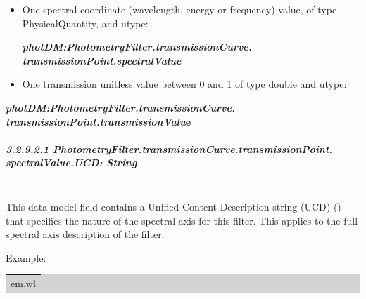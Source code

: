 \documentclass[11pt,a4paper]{ivoa}
\begin{document}
\begin{itemize}
	\item One spectral coordinate (wavelength, energy or frequency) value, of type PhysicalQuantity, and utype:\par

\begin{center}
{\fontsize{10pt}{12.0pt}\selectfont \textbf{\textit{photDM:PhotometryFilter.transmissionCurve.
transmissionPoint.spectralValue}}\par}
\end{center}\par

	\item One transmission unitless value between 0 and 1 of type double and utype:{\fontsize{11pt}{13.2pt}\selectfont \textit{ }\par}
\end{itemize}\par

\begin{center}
{\fontsize{10pt}{12.0pt}\selectfont \textbf{\textit{photDM:PhotometryFilter.transmissionCurve.
transmissionPoint.transmissionValu}e}\par}
\end{center}\par

\subparagraph{3.2.9.2.1
PhotometryFilter.transmissionCurve.transmissionPoint.
spectralValue.UCD: String} \hspace{0pt} \\
This data model field contains a Unified Content Description string (UCD) (\cite{2007ivoa.spec.0402M}) that specifies the nature of the spectral axis for this filter. This applies to the full spectral axis description of the filter.
\par

Example:
\par



\bigskip
\par
\begingroup\setlength{\fboxsep}{0pt}
\colorbox{lightgray}{%
\begin{tabular}{|p{5.53in}|}
em.wl
\end{tabular}%
}\endgroup
\par
\bigskip



\end{document}
